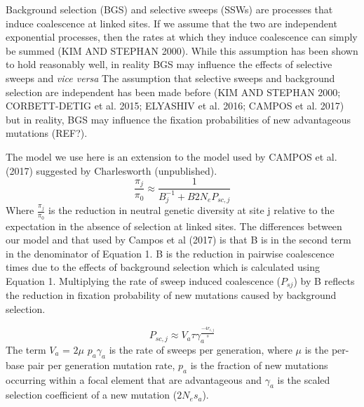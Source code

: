\documentclass[11pt]{article}
\begin{document}
	

	Background selection (BGS) and selective sweeps (SSWs) are processes that induce coalescence at  linked sites. If we assume that the two are independent exponential processes, then the rates at which they induce coalescence can simply be summed (KIM AND STEPHAN 2000). While this assumption has been shown to hold reasonably well, in reality BGS may influence the effects of selective sweeps and \emph{vice versa}
	The assumption that selective sweeps and background selection are independent has been made before	 (KIM AND STEPHAN 2000; CORBETT-DETIG et al. 2015; ELYASHIV et al. 2016; CAMPOS et al. 2017) but in reality, BGS may influence the fixation probabilities of new advantageous mutations (REF?). 

The model we use here is an extension to the model used by CAMPOS et al. (2017) suggested by Charlesworth (unpublished). 
\begin{equation}
\label{jointApprox}
\frac{\pi_{j}}{\pi_{0}} \approx  \frac{1}{B_{j}^{-1}  + B2N_eP_{sc,j}}
\end{equation}
	Where \(\frac{\pi_{j}}{\pi_{0}}\) is the reduction in neutral genetic diversity at site j relative to the expectation in the absence of selection at linked sites. The differences between our model and that used by Campos et al (2017) is that B is in the second term in the denominator of Equation 1. B is the reduction in pairwise coalescence times due to the effects of background selection which is calculated using Equation 1. Multiplying the rate of sweep induced coalescence ($P_{sj}$) by B reflects the reduction in fixation probability of new mutations caused by background selection. 

\begin{equation}
\label{singleClass}
P_{sc,j} \approx V_a \tau\gamma_a^{\frac{-4r_{i,j}}{s}} 
\end{equation}
The term $V_{a}$ = $2\mu$ $p_{a}\gamma_{a}$ is the rate of sweeps per generation, where $\mu$ is the per-base pair per generation mutation rate, $p_a$ is the fraction of new mutations occurring within a focal element that are advantageous and $\gamma_a$  is the scaled selection coefficient of a new mutation ($2N_es_a$).
\end{document}
